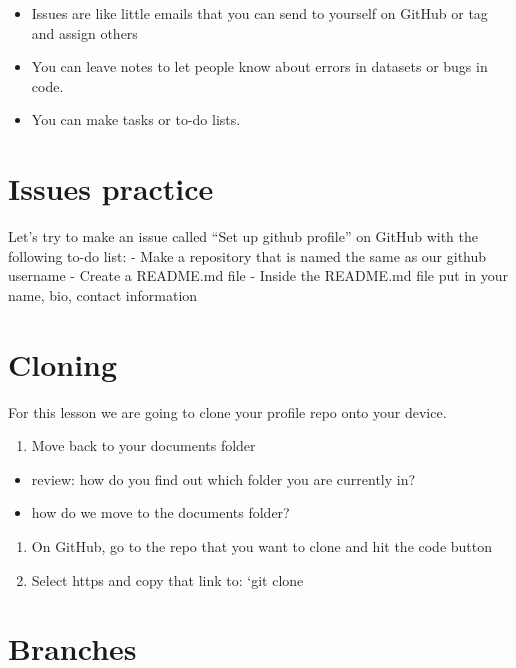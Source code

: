 \documentclass[]{article}
\providecommand{\tightlist}{%
  \setlength{\itemsep}{0pt}\setlength{\parskip}{0pt}}
\begin{document}
\begin{itemize}
\tightlist
\item
  Issues are like little emails that you can send to yourself on GitHub
  or tag and assign others
\item
  You can leave notes to let people know about errors in datasets or
  bugs in code.
\item
  You can make tasks or to-do lists.
\end{itemize}

\section{Issues practice}\label{issues-practice}

Let's try to make an issue called ``Set up github profile'' on GitHub
with the following to-do list: - Make a repository that is named the
same as our github username - Create a README.md file - Inside the
README.md file put in your name, bio, contact information

\section{Cloning}\label{cloning}

For this lesson we are going to clone your profile repo onto your
device.

\begin{enumerate}
\def\labelenumi{\arabic{enumi}.}
\tightlist
\item
  Move back to your documents folder
\end{enumerate}

\begin{itemize}
\tightlist
\item
  review: how do you find out which folder you are currently in?
\item
  how do we move to the documents folder?
\end{itemize}

\begin{enumerate}
\def\labelenumi{\arabic{enumi}.}
\setcounter{enumi}{1}
\tightlist
\item
  On GitHub, go to the repo that you want to clone and hit the code
  button
\item
  Select https and copy that link to: `git clone 
\end{enumerate}

\section{Branches}\label{branches}
\end{document}
